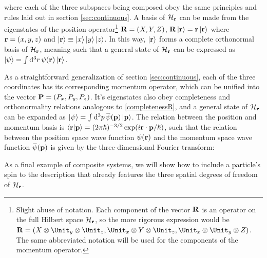 \documentclass[12pt,a4paper,notitlepage]{report}
\begin{document}
where each of the three subspaces being composed obey the same principles and rules laid out in section \ref{sec:continuous}. A basis of $\mathcal{H}_{\vb{r}}$ can be made from the eigenstates of the position operator\footnote{Slight abuse of notation. Each component of the vector $\vb{R}$ is an operator on the full Hilbert space $\mathcal{H}_{\vb{r}}$, so the more rigorous expression would be $\vb{R} = (X\otimes\Unit_y\otimes\Unit_z, \Unit_x\otimes Y\otimes\Unit_z, \Unit_x\otimes\Unit_y\otimes Z)$. The same abbreviated notation will be used for the components of the momentum operator.} $\vb{R} = (X, Y, Z)$, $\vb{R} \ket{\vb{r}} = \vb{r} \ket{\vb{r}}$ where $\vb{r} = (x, y, z)$ and $\ket{\vb{r}} \equiv \ket{x}\ket{y}\ket{z}$. In this way, $\ket{\vb{r}}$ forms a complete orthonormal basis of $\mathcal{H}_{\vb{r}}$, meaning
%
%
such that a general state of $\mathcal{H}_{\vb{r}}$ can be expressed as $\ket{\psi} = \int \dd[3]{r} \psi(\vb{r})\ket{\vb{r}}$.

As a straightforward generalization of section \ref{sec:continuous}, each of the three coordinates has its corresponding momentum operator, which can be unified into the vector $\vb{P} = (P_x, P_y, P_z)$. It's eigenstates also obey completeness and orthonormality relations analogous to \eqref{completenessR}, and a general state of $\mathcal{H}_{\vb{r}}$ can be expanded as $\ket{\psi} = \int \dd[3]{p} \overbar{\psi}(\vb{p}) \ket{\vb{p}}$. The relation between the position and momentum basis is $\bra{\vb{r}}\ket{\vb{p}} = (2\pi\hbar)^{-3/2} \exp(i \vb{r}\cdot\vb{p}/\hbar)$, such that the relation between the position space wave function $\psi(\vb{r})$ and the momentum space wave function $\overbar{\psi}(\vb{p})$ is given by the three-dimensional Fourier transform:

%
As a final example of composite systems, we will show how to include a particle's spin to the description that already features the three spatial degrees of freedom of $\mathcal{H}_{\vb{r}}$.
\end{document}
